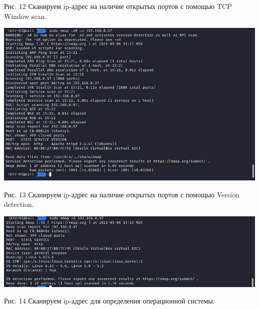 \documentclass[a4paper,14pt]{extarticle}
\begin{document}
\begin{center}
        Рис. 12 Сканируем ip-адрес на наличие открытых портов с помощью TCP Window scan.
        \vspace{1ex}

        \includegraphics[scale=0.5]{pics/12.png}

        Рис. 13 Сканируем ip-адрес на наличие открытых портов с помощью Version detection.
        \vspace{1ex}

        \includegraphics[scale=0.5]{pics/13.png}
        
        Рис. 14 Сканируем ip-адрес для определения операционной системы. 
        \vspace{1ex}
    \end{center}
\end{document}
